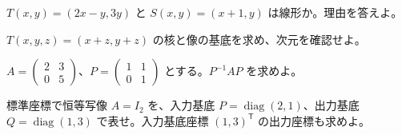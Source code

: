 \documentclass[11pt]{article}
\begin{document}

\problem[線形性]
$T(x,y)=(2x-y,3y)$ と $S(x,y)=(x+1,y)$ は線形か。理由を答えよ。
\workspace{38mm}

\problem[核と像]
$T(x,y,z)=(x+z,y+z)$ の核と像の基底を求め、次元を確認せよ。
\workspace{38mm}
\newpage

\problem[同じ基底での表現]
$A=\begin{pmatrix}2&3\\0&5\end{pmatrix}$、$P=\begin{pmatrix}1&1\\0&1\end{pmatrix}$ とする。$P^{-1}AP$ を求めよ。
\workspace{38mm}

\problem[異なる基底]
標準座標で恒等写像 $A=I_2$ を、入力基底 $P=\operatorname{diag}(2,1)$、出力基底 $Q=\operatorname{diag}(1,3)$ で表せ。入力基底座標 $(1,3)^{\mathsf T}$ の出力座標も求めよ。
\workspace{38mm}
\end{document}
